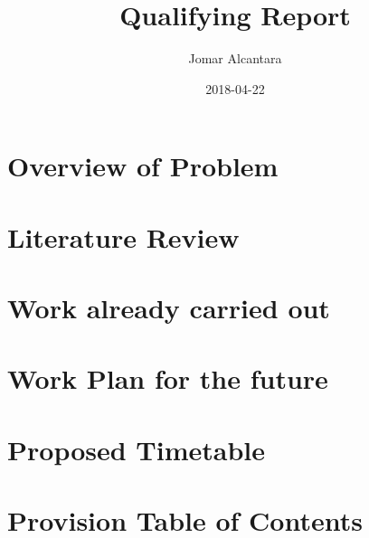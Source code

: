 \documentclass{article}
\title{Qualifying Report}
\date{2018-04-22}
\author{Jomar Alcantara}
\begin{document}
	\section{Overview of Problem}
	\section{Literature Review}
	\section{Work already carried out}
	\section{Work Plan for the future}
	\section{Proposed Timetable}
	\section{Provision Table of Contents}
\end{document}
